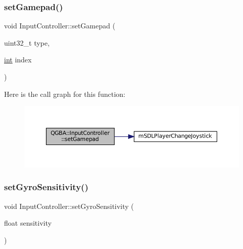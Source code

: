 \subsubsection{\texorpdfstring{set\+Gamepad()}{setGamepad()}}
{\footnotesize\ttfamily void Input\+Controller\+::set\+Gamepad (\begin{DoxyParamCaption}\item[{uint32\+\_\+t}]{type,  }\item[{\mbox{\hyperlink{ioapi_8h_a787fa3cf048117ba7123753c1e74fcd6}{int}}}]{index }\end{DoxyParamCaption})}

Here is the call graph for this function\+:
\nopagebreak
\begin{figure}[H]
\begin{center}
\leavevmode
\includegraphics[width=350pt]{class_q_g_b_a_1_1_input_controller_a6ee11725ccde4c1b61320e891a019772_cgraph}
\end{center}
\end{figure}
\mbox{\label{class_q_g_b_a_1_1_input_controller_a41ba2b4efa8962b2b38d1d2fde889033}} 
\subsubsection{\texorpdfstring{set\+Gyro\+Sensitivity()}{setGyroSensitivity()}}
{\footnotesize\ttfamily void Input\+Controller\+::set\+Gyro\+Sensitivity (\begin{DoxyParamCaption}\item[{float}]{sensitivity }\end{DoxyParamCaption})}

